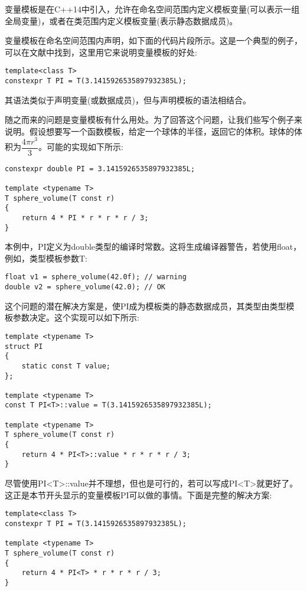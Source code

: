 变量模板是在C++14中引入，允许在命名空间范围内定义模板变量(可以表示一组全局变量)，或者在类范围内定义模板变量(表示静态数据成员)。

变量模板在命名空间范围内声明，如下面的代码片段所示。这是一个典型的例子，可以在文献中找到，这里用它来说明变量模板的好处:

\begin{lstlisting}[style=styleCXX]
template<class T>
constexpr T PI = T(3.1415926535897932385L);
\end{lstlisting}

其语法类似于声明变量(或数据成员)，但与声明模板的语法相结合。

随之而来的问题是变量模板有什么用处。为了回答这个问题，让我们些写个例子来说明。假设想要写一个函数模板，给定一个球体的半径，返回它的体积。球体的体积为$\dfrac{4\pi r^{3}}{3}$。可能的实现如下所示:

\begin{lstlisting}[style=styleCXX]
constexpr double PI = 3.1415926535897932385L;

template <typename T>
T sphere_volume(T const r)
{
	return 4 * PI * r * r * r / 3;
}
\end{lstlisting}

本例中，PI定义为double类型的编译时常数。这将生成编译器警告，若使用float，例如，类型模板参数T:

\begin{lstlisting}[style=styleCXX]
float v1 = sphere_volume(42.0f); // warning
double v2 = sphere_volume(42.0); // OK
\end{lstlisting}

这个问题的潜在解决方案是，使PI成为模板类的静态数据成员，其类型由类型模板参数决定。这个实现可以如下所示:

\begin{lstlisting}[style=styleCXX]
template <typename T>
struct PI
{
	static const T value;
};

template <typename T>
const T PI<T>::value = T(3.1415926535897932385L);

template <typename T>
T sphere_volume(T const r)
{
	return 4 * PI<T>::value * r * r * r / 3;
}
\end{lstlisting}

尽管使用PI<T>::value并不理想，但也是可行的，若可以写成PI<T>就更好了。这正是本节开头显示的变量模板PI可以做的事情。下面是完整的解决方案:

\begin{lstlisting}[style=styleCXX]
template<class T>
constexpr T PI = T(3.1415926535897932385L);

template <typename T>
T sphere_volume(T const r)
{
	return 4 * PI<T> * r * r * r / 3;
}
\end{lstlisting}

